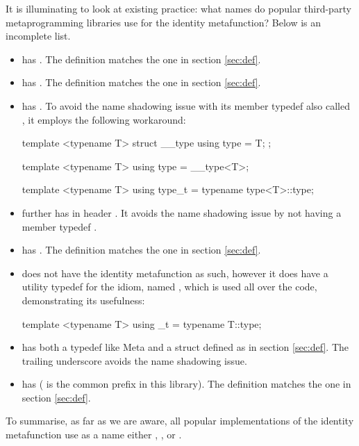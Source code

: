 It is illuminating to look at existing practice: what names do popular third-party metaprogramming libraries use for the identity metafunction? Below is an incomplete list.

\begin{itemize}
\item \cite{Boost.MPL} has . The definition matches the one in section \ref{sec:def}.
\item \cite{Boost.TypeTraits} has . The definition matches the one in section \ref{sec:def}.
\item \cite{Boost.Hana} has . To avoid the name shadowing issue with its member typedef also called , it employs the following workaround:
\begin{codeblock}
template <typename T>
struct __type { using type = T; };

template <typename T>
using type = __type<T>;

template <typename T>
using type_t = typename type<T>::type;
\end{codeblock}
\item \cite{Boost} further has  in header . It avoids the name shadowing issue by not having a member typedef .
\item \cite{Brigand} has . The definition matches the one in section \ref{sec:def}.
\item \cite{Meta} does not have the identity metafunction as such, however it does have a utility typedef for the  idiom, named , which is used all over the code, demonstrating its usefulness:
\begin{codeblock}
template <typename T>
using _t = typename T::type;
\end{codeblock}
\item \cite{Erasure} has both a typedef  like Meta and a struct  defined as in section \ref{sec:def}. The trailing underscore avoids the name shadowing issue.
\item \cite{Mp11} has  ( is the common prefix in this library). The definition matches the one in section \ref{sec:def}.
\end{itemize}

To summarise, as far as we are aware, all popular implementations of the identity metafunction use as a name either , , or .

